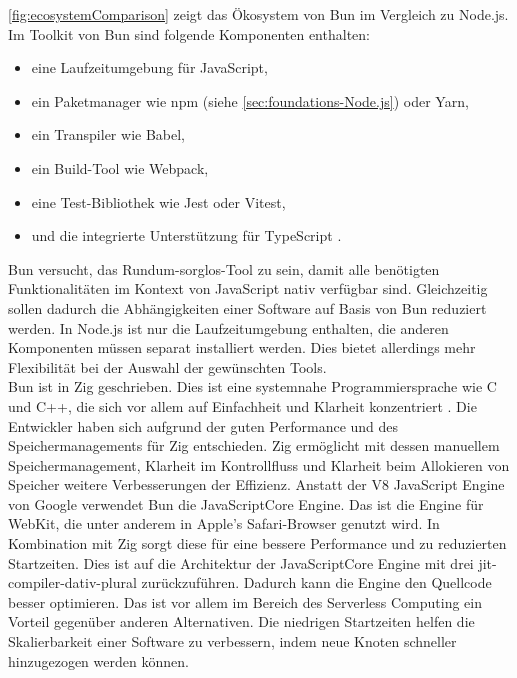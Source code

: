 \noindent
\autoref{fig:ecosystemComparison} zeigt das Ökosystem von Bun im Vergleich zu Node.js. Im Toolkit von Bun sind folgende Komponenten enthalten:
\begin{itemize}
	\item eine Laufzeitumgebung für JavaScript,
	\item ein Paketmanager wie \ac{npm} (siehe \autoref{sec:foundations-Node.js}) oder Yarn, 
	\item ein Transpiler wie Babel,
	\item ein Build-Tool wie Webpack,
	\item eine Test-Bibliothek wie Jest oder Vitest,
	\item und die integrierte Unterstützung für TypeScript \cite{Sumner.2023c}.
\end{itemize}

\noindent
Bun versucht, das Rundum-sorglos-Tool zu sein, damit alle benötigten Funktionalitäten im Kontext von JavaScript nativ verfügbar sind. Gleichzeitig sollen dadurch die Abhängigkeiten einer Software auf Basis von Bun reduziert werden. In Node.js ist nur die Laufzeitumgebung enthalten, die anderen Komponenten müssen separat installiert werden. Dies bietet allerdings mehr Flexibilität bei der Auswahl der gewünschten Tools.\cite{Springer.2022, OvenSh.2023c}\\

\noindent
Bun ist in Zig geschrieben. Dies ist eine systemnahe Programmiersprache wie C und C++, die sich vor allem auf Einfachheit und Klarheit konzentriert \cite{ZigSoftwareFoundation.o.J.}. Die Entwickler haben sich aufgrund der guten Performance und des Speichermanagements für Zig entschieden. Zig ermöglicht mit dessen manuellem Speichermanagement, Klarheit im Kontrollfluss und Klarheit beim Allokieren von Speicher weitere Verbesserungen der Effizienz. Anstatt der V8 JavaScript Engine von Google verwendet Bun die JavaScriptCore Engine. Das ist die Engine für WebKit, die unter anderem in Apple's Safari-Browser genutzt wird. In Kombination mit Zig sorgt diese für eine bessere Performance und zu reduzierten Startzeiten. Dies ist auf die Architektur der JavaScriptCore Engine mit drei \ac{jit-compiler-dativ-plural}  zurückzuführen. Dadurch kann die Engine den Quellcode besser optimieren. Das ist vor allem im Bereich des Serverless Computing ein Vorteil gegenüber anderen Alternativen. Die niedrigen Startzeiten helfen die Skalierbarkeit einer Software zu verbessern, indem neue Knoten schneller hinzugezogen werden können.\cite{OvenSh.2023c, OvenSh.2022, Apple.o.J., Apple.o.J.b, Silva.2020}

